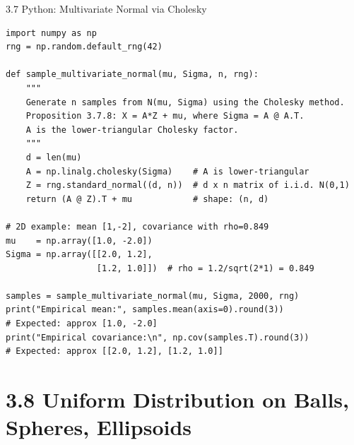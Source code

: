 \documentclass[aspectratio=169,10pt]{beamer}
\begin{document}
\begin{frame}[fragile]{3.7 Python: Multivariate Normal via Cholesky}
\begin{lstlisting}[style=python, caption={Multivariate normal sampling via Cholesky decomposition (Proposition 3.7.8)}]
import numpy as np
rng = np.random.default_rng(42)

def sample_multivariate_normal(mu, Sigma, n, rng):
    """
    Generate n samples from N(mu, Sigma) using the Cholesky method.
    Proposition 3.7.8: X = A*Z + mu, where Sigma = A @ A.T.
    A is the lower-triangular Cholesky factor.
    """
    d = len(mu)
    A = np.linalg.cholesky(Sigma)    # A is lower-triangular
    Z = rng.standard_normal((d, n))  # d x n matrix of i.i.d. N(0,1)
    return (A @ Z).T + mu            # shape: (n, d)

# 2D example: mean [1,-2], covariance with rho=0.849
mu    = np.array([1.0, -2.0])
Sigma = np.array([[2.0, 1.2],
                  [1.2, 1.0]])  # rho = 1.2/sqrt(2*1) = 0.849

samples = sample_multivariate_normal(mu, Sigma, 2000, rng)
print("Empirical mean:", samples.mean(axis=0).round(3))
# Expected: approx [1.0, -2.0]
print("Empirical covariance:\n", np.cov(samples.T).round(3))
# Expected: approx [[2.0, 1.2], [1.2, 1.0]]
\end{lstlisting}
\end{frame}

\section{3.8 Uniform Distribution on Balls, Spheres, Ellipsoids}
\end{document}
